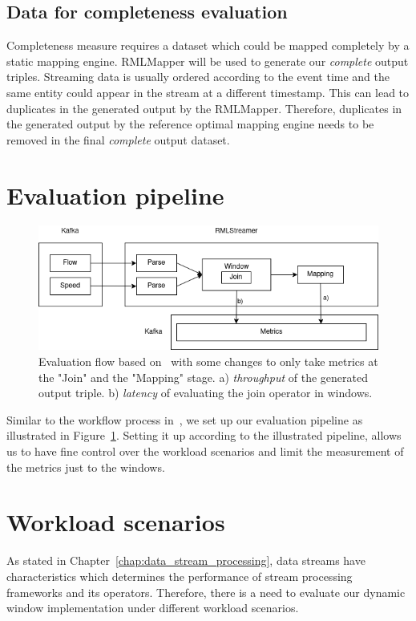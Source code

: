 \subsection{Data for completeness evaluation}
Completeness measure requires a dataset which could be mapped completely by a static 
mapping engine. RMLMapper  will
be used to generate our \emph{complete} output triples. Streaming data is usually 
ordered according to the event time and the same entity could appear in the 
stream at a different timestamp. This can lead to duplicates in the generated output by 
the RMLMapper. Therefore, duplicates in the generated output by the reference optimal
mapping engine needs to be removed in the final \emph{complete} output dataset.

\section{Evaluation pipeline}

\begin{figure}[!htbp]
    \centering
    \includegraphics[width=\textwidth]{fig/evaluation_architecture.png}
    \caption{Evaluation flow based on~\cite{evalution_of_spe} with some changes to only 
    take metrics at the "Join" and the "Mapping" stage. a) \emph{throughput} of the generated output triple. 
    b) \emph{latency} of evaluating the join operator in windows.}
    \label{fig:evaluation_flow}
    
\end{figure}

Similar to the workflow process in~\cite{evalution_of_spe, benchmark_sce}, we set up
our evaluation pipeline as illustrated in Figure~\ref{fig:evaluation_flow}. Setting it 
up according to the illustrated pipeline, allows us to have fine control over the 
workload scenarios and limit the measurement of the metrics just to the windows. 




\section{Workload scenarios}
As stated in Chapter~\ref{chap:data_stream_processing}, data streams have characteristics 
which determines the performance of stream processing frameworks and its operators. Therefore, 
there is a need to evaluate our dynamic window implementation under different workload scenarios. 

